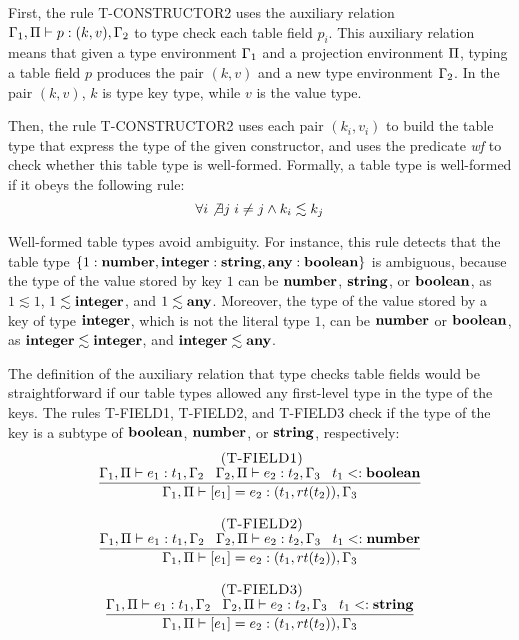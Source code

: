 First, the rule \textsc{T-CONSTRUCTOR2} uses the auxiliary relation
$\Gamma_{1}, \Pi \vdash p : (k,v), \Gamma_{2}$ to type check each table
field $p_{i}$.
This auxiliary relation means that given a type environment $\Gamma_{1}$
and a projection environment $\Pi$, typing a table field $p$
produces the pair $(k,v)$ and a new type environment $\Gamma_{2}$. 
In the pair $(k,v)$, $k$ is type key type, while $v$ is the value type.

Then, the rule \textsc{T-CONSTRUCTOR2} uses each pair $(k_{i},v_{i})$
to build the table type that express the type of the given constructor, and
uses the predicate \emph{wf} to check whether this table type is well-formed.
Formally, a table type is well-formed if it obeys the following rule:
\[
\forall i \not\exists j \; i \not= j \wedge k_{i} \lesssim k_{j}
\]

Well-formed table types avoid ambiguity.
For instance, this rule detects that the table type
$\{1:\mathbf{number}, \mathbf{integer}:\mathbf{string}, \mathbf{any}:\mathbf{boolean}\}$ is ambiguous,
because the type of the value stored by key $1$ can be
$\mathbf{number}$, $\mathbf{string}$, or $\mathbf{boolean}$, as $1 \lesssim 1$,
$1 \lesssim \mathbf{integer}$, and $1 \lesssim \mathbf{any}$.
Moreover, the type of the value stored by a key of type $\mathbf{integer}$,
which is not the literal type $1$, can be $\mathbf{number}$ or $\mathbf{boolean}$,
as $\mathbf{integer} \lesssim \mathbf{integer}$, and $\mathbf{integer} \lesssim \mathbf{any}$.

The definition of the auxiliary relation that type checks table
fields would be straightforward if our table types allowed any
first-level type in the type of the keys.
The rules \textsc{T-FIELD1}, \textsc{T-FIELD2}, and \textsc{T-FIELD3}
check if the type of the key is a subtype of $\mathbf{boolean}$, $\mathbf{number}$,
or $\mathbf{string}$, respectively:
\[
\begin{array}{c}
\begin{array}{c}
\; (\textsc{T-FIELD1})\\
\dfrac{\Gamma_{1}, \Pi \vdash e_{1}:t_{1}, \Gamma_{2} \;\;\;
       \Gamma_{2}, \Pi \vdash e_{2}:t_{2}, \Gamma_{3} \;\;\;
       t_{1} <: \mathbf{boolean}}
      {\Gamma_{1}, \Pi \vdash [e_{1}] = e_{2}: (t_{1},rt(t_{2})), \Gamma_{3}}
\end{array}
\\ \\
\begin{array}{c}
\; (\textsc{T-FIELD2})\\
\dfrac{\Gamma_{1}, \Pi \vdash e_{1}:t_{1}, \Gamma_{2} \;\;\;
       \Gamma_{2}, \Pi \vdash e_{2}:t_{2}, \Gamma_{3} \;\;\;
       t_{1} <: \mathbf{number}}
      {\Gamma_{1}, \Pi \vdash [e_{1}] = e_{2}: (t_{1},rt(t_{2})), \Gamma_{3}}
\end{array}
\\ \\
\begin{array}{c}
\; (\textsc{T-FIELD3})\\
\dfrac{\Gamma_{1}, \Pi \vdash e_{1}:t_{1}, \Gamma_{2} \;\;\;
       \Gamma_{2}, \Pi \vdash e_{2}:t_{2}, \Gamma_{3} \;\;\;
       t_{1} <: \mathbf{string}}
      {\Gamma_{1}, \Pi \vdash [e_{1}] = e_{2}: (t_{1},rt(t_{2})), \Gamma_{3}}
\end{array}
\end{array}
\]

